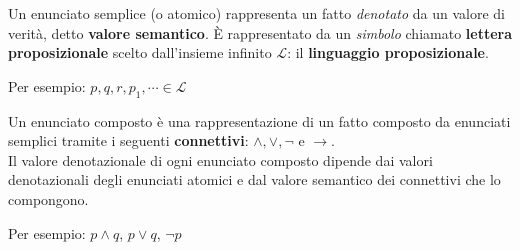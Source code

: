 \begin{defi}
  Un enunciato semplice (o atomico) rappresenta un fatto \textit{denotato} da un valore di verità, detto \textbf{valore semantico}. È rappresentato da un \textit{simbolo} chiamato \textbf{lettera proposizionale} scelto dall'insieme infinito $\mathscr{L}$: il \textbf{linguaggio proposizionale}.
  
  Per esempio: $p, q, r, p_1, \cdots \in \mathscr{L}$
\end{defi}
\begin{defi}
  Un enunciato composto è una rappresentazione di un fatto composto da enunciati semplici tramite i seguenti \textbf{connettivi}: $\land, \lor, \neg$ e $\rightarrow$. \\ 
  Il valore denotazionale di ogni enunciato composto dipende dai valori denotazionali degli enunciati atomici e dal valore semantico dei connettivi che lo compongono. 
  
  Per esempio: $p \land q$, $p \lor q$, $\neg p$
\end{defi}
